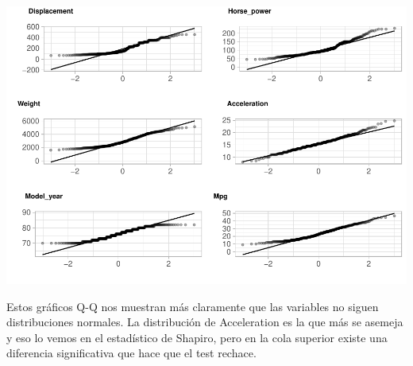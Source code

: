 \begin{center}\includegraphics{img/EDA_files/figure-latex/unnamed-chunk-14-7} \end{center}

Estos gráficos Q-Q nos muestran más claramente que las variables no siguen distribuciones normales. La distribución de Acceleration es la que más se asemeja y eso lo vemos en el estadístico de Shapiro, pero en la cola superior existe una diferencia significativa que hace que el test rechace.





